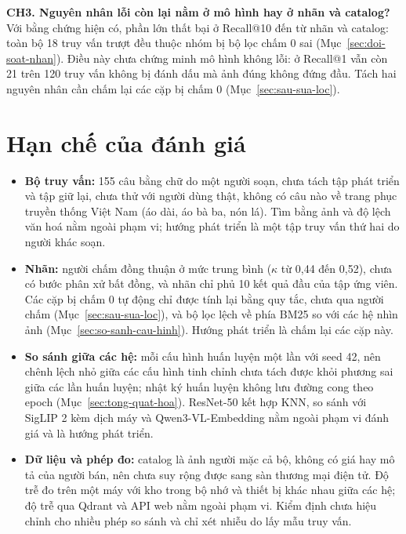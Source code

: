 \textbf{CH3. Nguyên nhân lỗi còn lại nằm ở mô hình hay ở nhãn và catalog?} Với bằng chứng hiện có, phần lớn thất bại ở Recall@10 đến từ nhãn và catalog: toàn bộ 18 truy vấn trượt đều thuộc nhóm bị bộ lọc chấm 0 sai (Mục~\ref{sec:doi-soat-nhan}). Điều này chưa chứng minh mô hình không lỗi: ở Recall@1 vẫn còn 21 trên 120 truy vấn không bị đánh dấu mà ảnh đúng không đứng đầu. Tách hai nguyên nhân cần chấm lại các cặp bị chấm 0 (Mục~\ref{sec:sau-sua-loc}).

\section{Hạn chế của đánh giá}
\label{sec:han-che-danh-gia}

\begin{itemize}
    \item \textbf{Bộ truy vấn:} 155 câu bằng chữ do một người soạn, chưa tách tập phát triển và tập giữ lại, chưa thử với người dùng thật, không có câu nào về trang phục truyền thống Việt Nam (áo dài, áo bà ba, nón lá). Tìm bằng ảnh và độ lệch văn hoá nằm ngoài phạm vi; hướng phát triển là một tập truy vấn thứ hai do người khác soạn.
    \item \textbf{Nhãn:} người chấm đồng thuận ở mức trung bình ($\kappa$ từ 0,44 đến 0,52), chưa có bước phân xử bất đồng, và nhãn chỉ phủ 10 kết quả đầu của tập ứng viên. Các cặp bị chấm 0 tự động chỉ được tính lại bằng quy tắc, chưa qua người chấm (Mục~\ref{sec:sau-sua-loc}), và bộ lọc lệch về phía BM25 so với các hệ nhìn ảnh (Mục~\ref{sec:so-sanh-cau-hinh}). Hướng phát triển là chấm lại các cặp này.
    \item \textbf{So sánh giữa các hệ:} mỗi cấu hình huấn luyện một lần với seed 42, nên chênh lệch nhỏ giữa các cấu hình tinh chỉnh chưa tách được khỏi phương sai giữa các lần huấn luyện; nhật ký huấn luyện không lưu đường cong theo epoch (Mục~\ref{sec:tong-quat-hoa}). ResNet-50 kết hợp KNN, so sánh với SigLIP 2 kèm dịch máy và Qwen3-VL-Embedding nằm ngoài phạm vi đánh giá và là hướng phát triển.
    \item \textbf{Dữ liệu và phép đo:} catalog là ảnh người mặc cả bộ, không có giá hay mô tả của người bán, nên chưa suy rộng được sang sàn thương mại điện tử. Độ trễ đo trên một máy với kho trong bộ nhớ và thiết bị khác nhau giữa các hệ; độ trễ qua Qdrant và API web nằm ngoài phạm vi. Kiểm định chưa hiệu chỉnh cho nhiều phép so sánh và chỉ xét nhiễu do lấy mẫu truy vấn.
\end{itemize}
